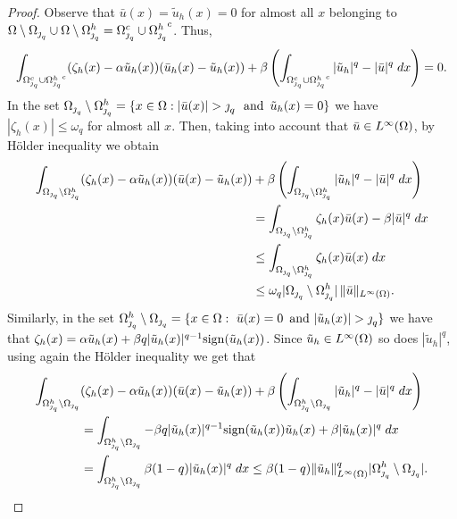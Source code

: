 {\begin{proof}
Observe that $\bar u(x)=\tilde u_h(x)=0$ for almost all $x$ belonging to $\Omega \setminus \Omega_{\operatorname{\jmath}_q} \cup \Omega \setminus \Omega^h_{\operatorname{\jmath}_q}= {\Omega^c_{\operatorname{\jmath}_q}}\cup {\Omega^h_{\operatorname{\jmath}_q}}^c$. Thus, 
\begin{equation}\label{eq:theorem_5_7}
\int_{{\Omega^c_{\operatorname{\jmath}_q}}\cup  {\Omega^h_{\operatorname{\jmath}_q}}^c}(\zeta_h(x)-\alpha\tilde u_h(x))(\bar u_h(x)-\tilde u_h(x))+\beta \left(\int_{{\Omega^c_{\operatorname{\jmath}_q}}\cup  {\Omega^h_{\operatorname{\jmath}_q}}^c}|\tilde u_h|^q-|\bar u|^q\; dx\right)=0.
\end{equation}
In the set  ${\Omega_{\operatorname{\jmath}_q}}\setminus {\Omega_{\operatorname{\jmath}_q}^h} = \{x\in \Omega : |\bar u(x)| >\operatorname{\jmath}_q \, \text{ and } \, \tilde u_h(x)=0\}$ we have $|\zeta_h(x)|\le \omega_q$ for almost all $x$. Then, taking into account that $\bar u \in L^\infty(\Omega)$, by H\"older inequality we obtain 
\begin{equation}\label{eq:theorem_5_8}
    \begin{split}
        \int_{{\Omega_{\operatorname{\jmath}_q}}\setminus {\Omega_{\operatorname{\jmath}_q}^h}}(\zeta_h(x)-\alpha\tilde u_h(x))(\bar u(x)-\tilde u_h(x))&+\beta \left(\int_{{\Omega_{\operatorname{\jmath}_q}}\setminus {\Omega_{\operatorname{\jmath}_q}^h}}|\tilde u_h|^q-|\bar u|^q\; dx\right)\\
        &=\int_{{\Omega_{\operatorname{\jmath}_q}}\setminus {\Omega_{\operatorname{\jmath}_q}^h}}\zeta_h(x)\bar u(x)-\beta |\bar u|^q\; dx\\
        &\le \int_{{\Omega_{\operatorname{\jmath}_q}}\setminus {\Omega_{\operatorname{\jmath}_q}^h}}\zeta_h(x)\bar u(x)\; dx\\
        &\le \omega_q |{\Omega_{\operatorname{\jmath}_q}}\setminus {\Omega_{\operatorname{\jmath}_q}^h}|\,\lVert \bar u \rVert_{L^\infty(\Omega)}.
    \end{split}
\end{equation}
Similarly, in the set  $\Omega^h_{\operatorname{\jmath}_q}\setminus \Omega_{\operatorname{\jmath}_q}= \{x\in \Omega : \ \bar u(x)=0 \, \text{ and } |\tilde u_h(x)| >\operatorname{\jmath}_q  \}$ we have that $\zeta_h(x)=\alpha\tilde u_h(x)+\beta q|\tilde u_h(x)|^{q-1}\mathrm{sign}(\tilde u_h(x))$. Since $\tilde u_h \in L^\infty(\Omega)$ so does $|\tilde u_h|^q$, using again the H\"older inequality we get that
\begin{equation}\label{eq:theorem_5_9}
    \begin{split}
        \int_{\om^h_{\jump_q}\setminus \om_{\jump_q}}&(\zeta_h(x)-\alpha\tilde u_h(x))(\bar u(x)-\tilde u_h(x))+\beta \l(\int_{\om^h_{\jump_q}\setminus \om_{\jump_q}}|\tilde u_h|^q-|\bar u|^q\; dx\r)\\
        &=\int_{\om^h_{\jump_q}\setminus \om_{\jump_q}}-\beta q|\tilde u_h(x)|^{q-1}\sign(\tilde u_h(x))\tilde u_h(x)+\beta|\tilde u_h(x)|^q\; dx\\
        &=\int_{\om^h_{\jump_q}\setminus \om_{\jump_q}}\beta(1-q)|\tilde u_h(x)|^{q}\; dx \le \beta(1-q)\norm{\tilde u_h}^q_{L^\infty(\om)}|\om^h_{\jump_q}\setminus \om_{\jump_q}|.

\end{split}
\end{equation}
\end{proof}}
